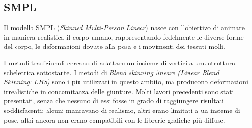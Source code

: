 




\subsection{SMPL}

Il modello SMPL (\emph{Skinned Multi-Person Linear}) nasce con l'obiettivo di animare in maniera realistica il corpo umano, rappresentando fedelmente le diverse forme del corpo, le deformazioni dovute alla posa e i movimenti dei tessuti molli.

I metodi tradizionali cercano di adattare un insieme di vertici a una struttura scheletrica sottostante.
I metodi di \emph{Blend skinning lineare (Linear Blend Skinning: LBS)} sono i più utilizzati in questo ambito, ma producono deformazioni irrealistiche in concomitanza delle giunture.
Molti lavori precedenti sono stati presentati, senza che nessuno di essi fosse in grado di raggiungere risultati soddisfacenti:
alcuni mancavano di realismo, altri erano limitati a un insieme di pose, altri ancora non erano compatibili con le librerie grafiche più diffuse.

